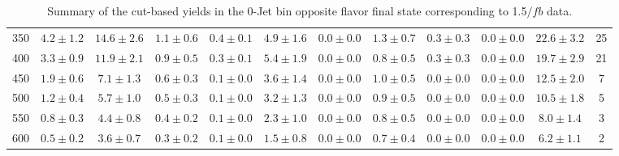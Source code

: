\begin{table}
{\begin{center}
\begin{tabular}{l c c c c c c c c c c c }
350 & $4.2\pm1.2$ & $14.6\pm2.6$ & $1.1\pm0.6$ & $0.4\pm0.1$ & $4.9\pm1.6$ & $0.0\pm0.0$ & $1.3\pm0.7$ & $0.3\pm0.3$ & $0.0\pm0.0$ & $22.6\pm3.2$ & 25 \\
400 & $3.3\pm0.9$ & $11.9\pm2.1$ & $0.9\pm0.5$ & $0.3\pm0.1$ & $5.4\pm1.9$ & $0.0\pm0.0$ & $0.8\pm0.5$ & $0.3\pm0.3$ & $0.0\pm0.0$ & $19.7\pm2.9$ & 21 \\
450 & $1.9\pm0.6$ & $7.1\pm1.3$ & $0.6\pm0.3$ & $0.1\pm0.0$ & $3.6\pm1.4$ & $0.0\pm0.0$ & $1.0\pm0.5$ & $0.0\pm0.0$ & $0.0\pm0.0$ & $12.5\pm2.0$ & 7 \\
500 & $1.2\pm0.4$ & $5.7\pm1.0$ & $0.5\pm0.3$ & $0.1\pm0.0$ & $3.2\pm1.3$ & $0.0\pm0.0$ & $0.9\pm0.5$ & $0.0\pm0.0$ & $0.0\pm0.0$ & $10.5\pm1.8$ & 5 \\
550 & $0.8\pm0.3$ & $4.4\pm0.8$ & $0.4\pm0.2$ & $0.1\pm0.0$ & $2.3\pm1.0$ & $0.0\pm0.0$ & $0.8\pm0.5$ & $0.0\pm0.0$ & $0.0\pm0.0$ & $8.0\pm1.4$ & 3 \\
600 & $0.5\pm0.2$ & $3.6\pm0.7$ & $0.3\pm0.2$ & $0.1\pm0.0$ & $1.5\pm0.8$ & $0.0\pm0.0$ & $0.7\pm0.4$ & $0.0\pm0.0$ & $0.0\pm0.0$ & $6.2\pm1.1$ & 2 \\
\hline
\end{tabular}
\end{center}
}
\caption{Summary of the cut-based yields in the 0-Jet bin opposite flavor final state corresponding to 1.5$/fb$ data.}
\end{table}

